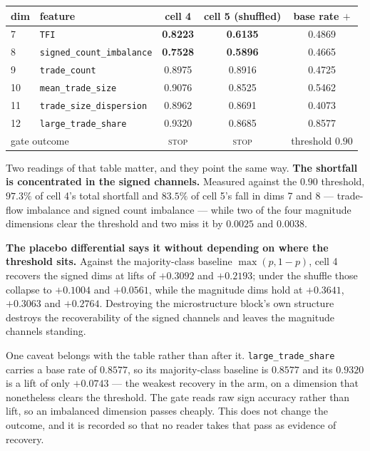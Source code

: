 \begin{center}
\begin{tabular}{llccc}
\toprule
dim & feature & cell 4 & cell 5 (shuffled) & base rate $+$ \\
\midrule
7 & \texttt{TFI} & \textbf{0.8223} & \textbf{0.6135} & 0.4869 \\
8 & \texttt{signed\_count\_imbalance} & \textbf{0.7528} & \textbf{0.5896} & 0.4665 \\
9 & \texttt{trade\_count} & 0.8975 & 0.8916 & 0.4725 \\
10 & \texttt{mean\_trade\_size} & 0.9076 & 0.8525 & 0.5462 \\
11 & \texttt{trade\_size\_dispersion} & 0.8962 & 0.8691 & 0.4073 \\
12 & \texttt{large\_trade\_share} & 0.9320 & 0.8685 & 0.8577 \\
\midrule
\multicolumn{2}{l}{gate outcome} & \textsc{stop} & \textsc{stop} & threshold $0.90$ \\
\bottomrule
\end{tabular}
\end{center}

Two readings of that table matter, and they point the same way. \textbf{The shortfall is
concentrated in the signed channels.} Measured against the $0.90$ threshold, $97.3\%$ of cell 4's
total shortfall and $83.5\%$ of cell 5's fall in dims 7 and 8 --- trade-flow imbalance and signed
count imbalance --- while two of the four magnitude dimensions clear the threshold and two miss it
by $0.0025$ and $0.0038$.

\textbf{The placebo differential says it without depending on where the threshold sits.} Against
the majority-class baseline $\max(p, 1-p)$, cell 4 recovers the signed dims at lifts of $+0.3092$
and $+0.2193$; under the shuffle those collapse to $+0.1004$ and $+0.0561$, while the magnitude
dims hold at $+0.3641$, $+0.3063$ and $+0.2764$. Destroying the microstructure block's own
structure destroys the recoverability of the signed channels and leaves the magnitude channels
standing.

One caveat belongs with the table rather than after it. \texttt{large\_trade\_share} carries a base
rate of $0.8577$, so its majority-class baseline is $0.8577$ and its $0.9320$ is a lift of only
$+0.0743$ --- the weakest recovery in the arm, on a dimension that nonetheless clears the
threshold. The gate reads raw sign accuracy rather than lift, so an imbalanced dimension passes
cheaply. This does not change the outcome, and it is recorded so that no reader takes that pass as
evidence of recovery.

